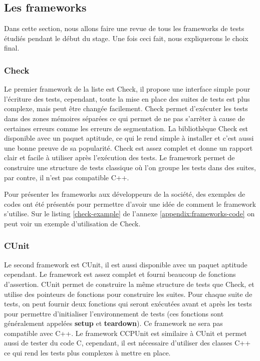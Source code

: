 \documentclass[a4paper]{article}
\begin{document}
\subsection{Les frameworks}%

Dans cette section, nous allons faire une revue de tous les frameworks de tests
étudiés pendant le début du stage. Une fois ceci fait, nous expliquerons le
choix final.

\subsubsection*{Check}

Le premier framework de la liste est Check, il propose une interface simple pour
l'écriture des tests, cependant, toute la mise en place des suites de tests est
plus complexe, mais peut être changée facilement. Check permet d'exécuter les
tests dans des zones mémoires séparées ce qui permet de ne pas s'arrêter à cause
de certaines erreurs comme les erreurs de segmentation. La bibliothèque Check
est disponible avec un paquet aptitude, ce qui le rend simple à installer et
c'est aussi une bonne preuve de sa popularité. Check est assez complet et donne
un rapport clair et facile à utiliser après l'exécution des tests. Le framework
permet de construire une structure de tests classique où l'on groupe les tests
dans des suites, par contre, il n'est pas compatible C++.

Pour présenter les frameworks aux développeurs de la société, des exemples de
codes ont été présentés pour permettre d'avoir une idée de comment le framework
s'utilise. Sur le listing \ref{check-example} de l'annexe
\ref{appendix:frameworks-code} on peut voir un exemple d'utilisation de Check.

\subsubsection*{CUnit}

Le second framework est CUnit, il est aussi disponible avec un paquet aptitude
cependant. Le framework est assez complet et fourni beaucoup de fonctions
d'assertion. CUnit permet de construire la même structure de tests que Check, et
utilise des pointeurs de fonctions pour construire les suites. Pour chaque suite
de tests, on peut fournir deux fonctions qui seront exécutées avant et après les
tests pour permettre d'initialiser l'environnement de tests (ces fonctions sont
généralement appelées \textbf{setup} et \textbf{teardown}). Ce framework ne sera
pas compatible avec C++. Le framework CCPUnit est similaire à CUnit et permet
aussi de tester du code C, cependant, il est nécessaire d'utiliser des classes
C++ ce qui rend les tests plus complexes à mettre en place.
\end{document}
